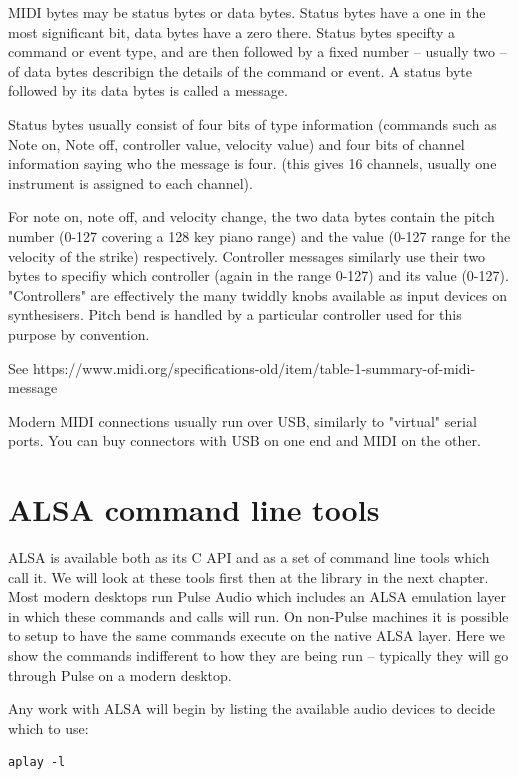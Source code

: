 \documentclass[oneside,english]{scrbook}
\begin{document}
MIDI bytes may be status bytes or data bytes. Status bytes have a one in the most significant bit, data bytes have a zero there.  Status bytes specifty a command or event type, and are then followed by a fixed number -- usually two -- of data bytes describign the details of the command or event.  A status byte followed by its data bytes is called a message.

Status bytes usually consist of four bits of type information (commands such as Note on, Note off, controller value, velocity value) and four bits of channel information saying who the message is four. (this gives 16 channels, usually one instrument is assigned to each channel).

For note on, note off, and velocity change, the two data bytes contain the pitch number (0-127 covering a 128 key piano range) and the value (0-127 range for the velocity of the strike) respectively.   Controller messages similarly use their two bytes to specifiy which controller (again in the range 0-127) and its value (0-127).  "Controllers" are effectively the many twiddly knobs available as input devices on synthesisers.    Pitch bend is handled by a particular controller used for this purpose by convention.

See https://www.midi.org/specifications-old/item/table-1-summary-of-midi-message

Modern MIDI connections usually run over USB, similarly to "virtual" serial ports.  You can buy connectors with USB on one end and MIDI on the other.


\chapter{ALSA command line tools}

ALSA is available both as its C API and as a set of command line tools which call it.  We will look at these tools first then at the library in the next chapter.   Most modern desktops run Pulse Audio which includes an ALSA emulation layer in which these commands and calls will run. On non-Pulse machines it is possible to setup to have the same commands execute on the native ALSA layer.  Here we show the commands indifferent to how they are being run -- typically they will go through Pulse on a modern desktop.

Any work with ALSA will begin by listing the available audio devices to decide which to use:
\begin{lstlisting}
aplay -l
\end{lstlisting}
\end{document}
